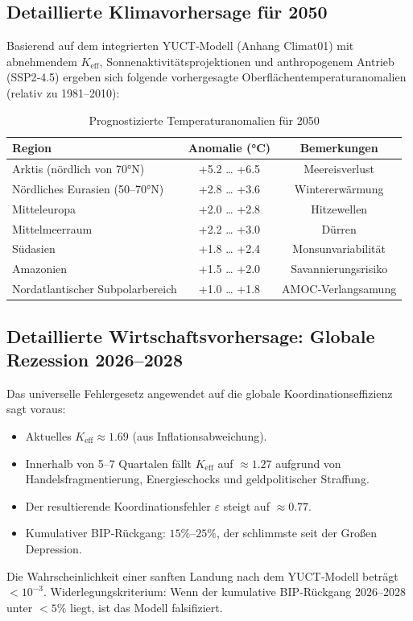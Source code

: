 \documentclass[12pt,a4paper]{article}
\newcommand{\Keff}{K_{\mathrm{eff}}}
\begin{document}
	\subsection{Detaillierte Klimavorhersage für 2050}
	
	Basierend auf dem integrierten YUCT‑Modell (Anhang Climat01) mit abnehmendem $\Keff$,
	Sonnenaktivitätsprojektionen und anthropogenem Antrieb (SSP2‑4.5) ergeben sich folgende
	vorhergesagte Oberflächentemperaturanomalien (relativ zu 1981–2010):
	
	\begin{table}[H]
		\centering
		\caption{Prognostizierte Temperaturanomalien für 2050}
		\begin{tabular}{lcc}
			\toprule
			Region & Anomalie (°C) & Bemerkungen \\
			\midrule
			Arktis (nördlich von 70°N) & +5.2 … +6.5 & Meereisverlust \\
			Nördliches Eurasien (50–70°N) & +2.8 … +3.6 & Wintererwärmung \\
			Mitteleuropa & +2.0 … +2.8 & Hitzewellen \\
			Mittelmeerraum & +2.2 … +3.0 & Dürren \\
			Südasien & +1.8 … +2.4 & Monsunvariabilität \\
			Amazonien & +1.5 … +2.0 & Savannierungsrisiko \\
			Nordatlantischer Subpolarbereich & +1.0 … +1.8 & AMOC‑Verlangsamung \\
			\bottomrule
		\end{tabular}
	\end{table}
	
	\subsection{Detaillierte Wirtschaftsvorhersage: Globale Rezession 2026–2028}
	
	Das universelle Fehlergesetz angewendet auf die globale Koordinationseffizienz sagt voraus:
	\begin{itemize}
		\item Aktuelles $\Keff \approx 1.69$ (aus Inflationsabweichung).
		\item Innerhalb von 5–7 Quartalen fällt $\Keff$ auf $\approx 1.27$ aufgrund von Handelsfragmentierung,
		Energieschocks und geldpolitischer Straffung.
		\item Der resultierende Koordinationsfehler $\varepsilon$ steigt auf $\approx 0.77$.
		\item Kumulativer BIP‑Rückgang: $15\%$–$25\%$, der schlimmste seit der Großen Depression.
	\end{itemize}
	Die Wahrscheinlichkeit einer sanften Landung nach dem YUCT‑Modell beträgt $<10^{-3}$.
	Widerlegungskriterium: Wenn der kumulative BIP‑Rückgang 2026–2028 unter $<5\%$ liegt, ist das Modell falsifiziert.
	
\end{document}
